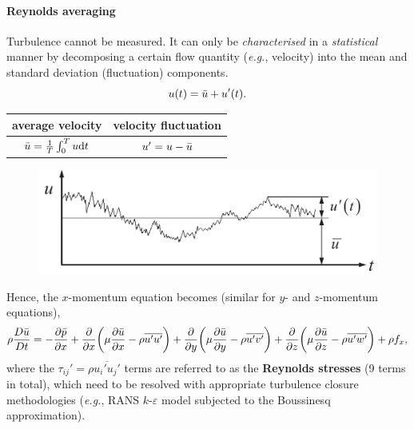 \documentclass[a4paper]{article}
\begin{document}
\paragraph{Reynolds averaging} Turbulence cannot be measured. It can only be \textit{characterised} in a \textit{statistical} manner by decomposing a certain flow quantity (\textit{e.g.}, velocity) into the mean and standard deviation (fluctuation) components. 
\[
    u(t) = \Bar{u} + u'(t).
\]

\begin{minipage}{.4\textwidth}
\vspace{.5cm}
\begin{center}
    \begin{tabular}{c c}
    \toprule
    average velocity    &   velocity fluctuation\\
    \midrule
    $\Bar{u} = \frac{1}{T} \int_{0}^{T} u \mathrm{d}t$     & $u' = u - \Bar{u}$\\
    \bottomrule
    \end{tabular}
\end{center}
\end{minipage}
\begin{minipage}{.6\textwidth}
    \begin{figure}[H]
        \centering
        \includegraphics[width=.7\textwidth]{img/turbulence_v.PNG}
    \end{figure}
\end{minipage}

\vspace{.2cm}
Hence, the $x$-momentum equation becomes (similar for $y$- and $z$-momentum equations),
\[
    \rho \frac{D\Bar{u}}{Dt} = -\frac{\partial \Bar{p}}{\partial x} + \frac{\partial}{\partial x} \bigg(\mu \frac{\partial\Bar{u}}{\partial x} - \rho \overline{u'u'}\bigg) + \frac{\partial}{\partial y} \bigg(\mu \frac{\partial\Bar{u}}{\partial y} - \rho \overline{u'v'}\bigg) + \frac{\partial}{\partial z} \bigg(\mu \frac{\partial\Bar{u}}{\partial z} - \rho \overline{u'w'}\bigg) + \rho f_x,
\]
where the $\tau_{ij}' = \rho\overline{u_i' u_j'}$ terms are referred to as the \textbf{Reynolds stresses} (9 terms in total), which need to be resolved with appropriate turbulence closure methodologies (\textit{e.g.}, RANS $k$-$\varepsilon$ model subjected to the Boussinesq approximation).
\end{document}
